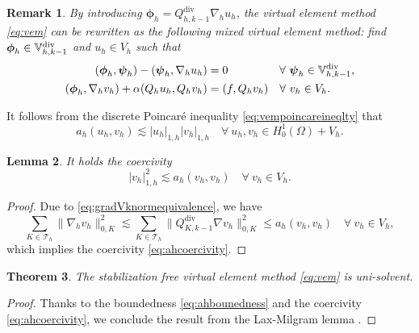 \documentclass[10pt]{amsart}
\newtheorem{theorem}{Theorem}[section]
\newtheorem{lemma}[theorem]{Lemma}
\newtheorem{remark}[theorem]{Remark}
\renewcommand{\div}{\operatorname{div}}
\numberwithin{equation}{section}
\begin{document}
\begin{remark}\rm
By introducing $\boldsymbol{\phi}_h=Q_{h,k-1}^{\div}\nabla_h u_h$, the virtual element method \eqref{eq:vem} can be rewritten as the following mixed virtual element method: find $\boldsymbol{\phi}_h\in\mathbb{V}_{h,k-1}^{\rm div}$ and $u_h\in V_h$ such that
\begin{equation*}
\begin{aligned}
(\boldsymbol{\phi}_h, \boldsymbol{\psi}_h) - (\boldsymbol{\psi}_h, \nabla_h u_h)&=0 \quad\quad\quad\quad\;\;\forall~\boldsymbol{\psi}_h\in\mathbb{V}_{h,k-1}^{\rm div},\\
(\boldsymbol{\phi}_h, \nabla_h v_h)+\alpha(Q_hu_h, Q_hv_h)&=(f, Q_hv_h)\quad\forall~v_h\in V_h.
\end{aligned}
\end{equation*}
\end{remark}

It follows from the discrete Poincar\'e inequality \eqref{eq:vempoincareineqlty} that 
\begin{equation}\label{eq:ahbounedness}
a_h(u_h, v_h)\lesssim |u_h|_{1,h}|v_h|_{1,h}\quad\forall~u_h,v_h\in H_0^1(\Omega)+V_h.
\end{equation}  
\begin{lemma}
It holds the coercivity
\begin{equation}\label{eq:ahcoercivity}
|v_h|_{1,h}^2\lesssim a_h(v_h, v_h)\quad\forall~v_h\in V_h.
\end{equation}  
\end{lemma}
\begin{proof}
Due to \eqref{eq:gradVknormequivalence}, we have
$$
\sum_{K\in\mathcal T_h}\|\nabla_h v_h\|_{0,K}^2\lesssim \sum_{K\in\mathcal T_h}\|Q_{K,k-1}^{\div}\nabla v_h\|_{0,K}^2\leq a_h(v_h, v_h)\quad\forall~v_h\in V_h,
$$
which implies the coercivity \eqref{eq:ahcoercivity}.
\end{proof}

\begin{theorem}
The stabilization free virtual element method \eqref{eq:vem} is uni-solvent.
\end{theorem}
\begin{proof}
Thanks to the boundedness \eqref{eq:ahbounedness} and the coercivity \eqref{eq:ahcoercivity}, we conclude the result from the Lax-Milgram lemma \cite{LaxMilgram1954}.
\end{proof}
\end{document}
